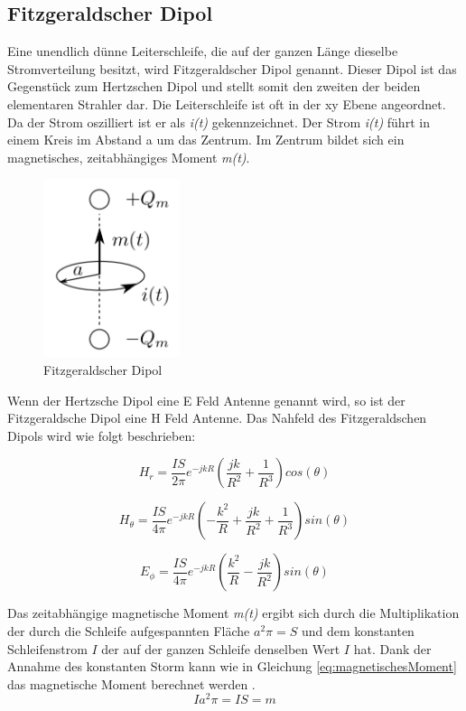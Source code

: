 \subsection{Fitzgeraldscher Dipol }\label{sec:FitzgeraldescherDipol}
Eine unendlich dünne Leiterschleife, die auf der ganzen Länge dieselbe Stromverteilung besitzt, wird Fitzgeraldscher Dipol genannt. Dieser Dipol ist das Gegenstück zum Hertzschen Dipol und stellt somit den zweiten der beiden elementaren Strahler dar. Die Leiterschleife ist oft in der xy Ebene angeordnet. Da der Strom oszilliert ist er als \textit{i(t)} gekennzeichnet. Der Strom \textit{i(t)} führt in einem Kreis im Abstand a um das Zentrum. Im Zentrum bildet sich ein magnetisches, zeitabhängiges Moment \textit{m(t)}.
\begin{figure}[!htb]
	\centering
	\includegraphics[width=4cm]{content/bilder/Fitzgerald_Dipol_EMANT_S37.pdf}%
	\caption{Fitzgeraldscher Dipol \cite{Emant}}
	\label{FitzDipol}
\end{figure}
Wenn der Hertzsche Dipol eine E Feld Antenne genannt wird, so ist der Fitzgeraldsche Dipol eine H Feld Antenne. Das Nahfeld des Fitzgeraldschen Dipols wird wie folgt beschrieben\cite{elliott1981antenna}:

\begin{equation}
H_r= \frac{I S}{2\pi}   e^{-jkR} \left( \frac{jk}{R^{2}}  + \frac{1}{R^{3}} \right) cos(\theta)
\end{equation}

\begin{equation}
H_\theta= \frac{I S}{4\pi}   e^{-jkR} \left(- \frac{k^{2}}{R}  + \frac{jk}{R^{2}}+ \frac{1}{R^{3}} \right) sin(\theta)
\end{equation}

\begin{equation}
E_\phi= \frac{I S}{4\pi}   e^{-jkR} \left( \frac{k^{2}}{R}  - \frac{jk}{R^{2}} \right) sin(\theta)
\end{equation}

Das zeitabhängige magnetische Moment \textit{m(t)} ergibt sich durch die Multiplikation der durch die Schleife aufgespannten Fläche $a^{2}\pi=S$ und dem konstanten Schleifenstrom $I$ der auf der ganzen Schleife denselben Wert $I$ hat. Dank der Annahme des konstanten Storm kann wie in Gleichung \ref{eq:magnetischesMoment} das magnetische Moment berechnet werden \cite{Harrington-TimeHarmonic}. 
\begin{equation}\label{eq:magnetischesMoment}
Ia^{2}\pi=IS=m
\end{equation}

